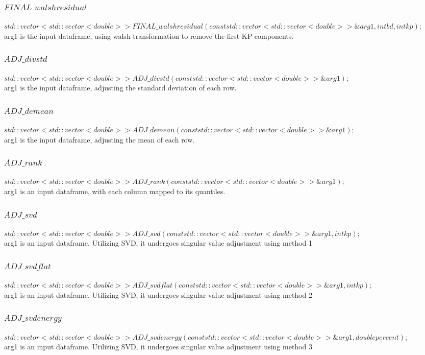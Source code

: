 \documentclass{article}
\begin{document}
\begin{CJK}{UTF8}{gbsn}
\begin{spacing}{1.5}
\subsubsection{$FINAL\_walshresidual$}
$std::vector<std::vector<double>> FINAL\_walshresidual(const std::vector<std::vector<double>> \&arg1, int bd, int kp) ;$\\
arg1 is the input dataframe, using walsh transformation to remove the first KP components.



\subsubsection{$ADJ\_divstd$}
$std::vector<std::vector<double>> ADJ\_divstd(const std::vector<std::vector<double>> \&arg1) ;$\\
arg1 is the input dataframe, adjusting the standard deviation of each row.
\subsubsection{$ADJ\_demean$}
$std::vector<std::vector<double>> ADJ\_demean(const std::vector<std::vector<double>> \&arg1) ;$\\
arg1 is the input dataframe, adjusting the mean of each row.
\subsubsection{$ADJ\_rank$}
$std::vector<std::vector<double>> ADJ\_rank(const std::vector<std::vector<double>> \&arg1) ;$\\
arg1 is an input dataframe, with each column mapped to its quantiles.
\subsubsection{$ADJ\_svd$}
$std::vector<std::vector<double>> ADJ\_svd(const std::vector<std::vector<double>> \&arg1, int kp) ;$\\
arg1 is an input dataframe. Utilizing SVD, it undergoes singular value adjustment using method 1
\subsubsection{$ADJ\_svdflat$}
$std::vector<std::vector<double>> ADJ\_svdflat(const std::vector<std::vector<double>> \&arg1, int kp) ;$\\
arg1 is an input dataframe. Utilizing SVD, it undergoes singular value adjustment using method 2
\subsubsection{$ADJ\_svdenergy$}
$std::vector<std::vector<double>> ADJ\_svdenergy(const std::vector<std::vector<double>> \&arg1, double percent) ;$\\
arg1 is an input dataframe. Utilizing SVD, it undergoes singular value adjustment using method 3


\end{spacing}
\end{CJK}
\end{document}
